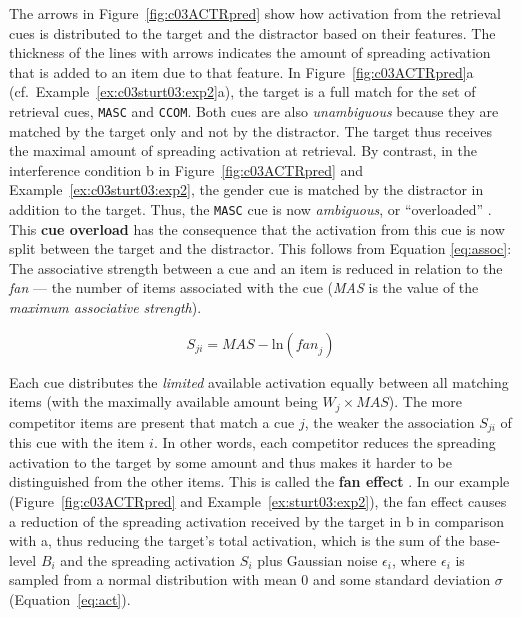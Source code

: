 \documentclass{cambridge7A}\usepackage[]{graphicx}\usepackage[]{color}
\newcommand{\actrcue}[1]{\texttt{\uppercase{#1}}}
\newcommand{\revFE}[1]{#1}
\begin{document}
The arrows in Figure~\ref{fig:c03ACTRpred} show how activation from the retrieval cues is distributed to the target and the distractor based on their features. The thickness of the lines with arrows indicates the amount of spreading activation that is added to an item due to that feature.
In Figure~\ref{fig:c03ACTRpred}a (cf.\ Example~\ref{ex:c03sturt03:exp2}a), the target is a full match for the set of retrieval cues, \actrcue{masc} and \actrcue{ccom}. Both cues are also \emph{unambiguous} because they are matched by the target only and not by the distractor. The target thus receives the maximal amount of spreading activation at retrieval. By contrast, 
in the interference condition b in Figure~\ref{fig:c03ACTRpred} and Example~\ref{ex:c03sturt03:exp2}, the gender cue is matched by the distractor in addition to the target. Thus, the \actrcue{MASC} cue is now \emph{ambiguous}, or ``overloaded'' \citep{WatkinsWatkins1975}. This \textbf{cue overload} has the consequence that the activation from this cue is now split between the target and the distractor. 
This follows from Equation \ref{eq:assoc}: The associative strength between a cue and an item is reduced in relation to the \emph{fan} --- the number of items associated with the cue (\textit{MAS} is the value of the \emph{maximum associative strength}).

\begin{equation}
  S_{ji} = \textit{MAS} - \text{ln}(\textit{fan}_{j}) \label{eq:assoc}%
\end{equation}

Each cue distributes the \emph{limited} available activation equally between all matching items (with the maximally available amount being $W_j\times\textit{MAS}$).
The more competitor items are present that match a cue $j$, the weaker the association $S_{ji}$ of this cue with the item $i$. In other words, each competitor \revFE{reduces the spreading activation to the target by some amount and thus makes it harder to be distinguished} from the other items.
This is called the \textbf{fan effect} \citep{anderson1974retrieval}. 
In our example (Figure~\ref{fig:c03ACTRpred} and Example~\ref{ex:sturt03:exp2}), the fan effect causes a reduction of the spreading activation received by the target in b in comparison with a, thus reducing the target's total activation, which is the sum of the base-level $B_i$ and the spreading activation $S_i$ plus Gaussian noise $\epsilon_i$, where $\epsilon_i$ is sampled from a normal distribution with mean 0 and some standard deviation $\sigma$ (Equation~\ref{eq:act}). 
\end{document}

